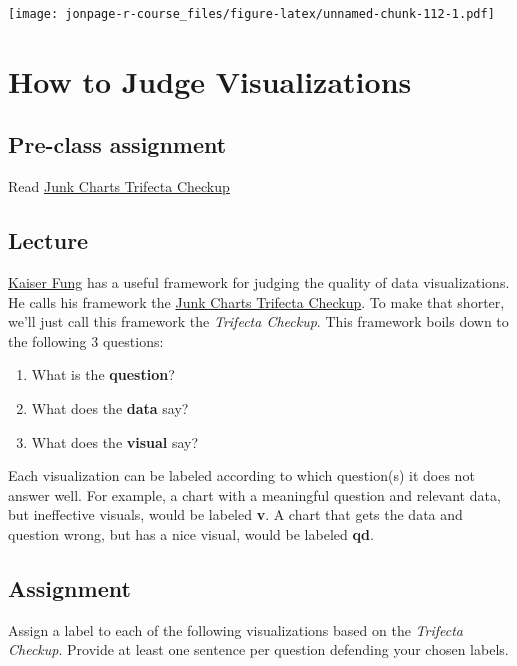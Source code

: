 \documentclass[]{book}
\providecommand{\tightlist}{%
  \setlength{\itemsep}{0pt}\setlength{\parskip}{0pt}}
\theoremstyle{definition}
\theoremstyle{definition}
\theoremstyle{remark}
\begin{document}
\texttt{[image: jonpage-r-course\_files/figure-latex/unnamed-chunk-112-1.pdf]}

\hypertarget{trifecta}{\chapter*{How to Judge
Visualizations}\label{trifecta}}

\section*{Pre-class assignment}\label{pre-class-assignment}

Read
\href{http://junkcharts.typepad.com/junk_charts/junk-charts-trifecta-checkup-the-definitive-guide.html}{Junk
Charts Trifecta Checkup}

\section*{Lecture}\label{lecture}

\href{http://junkcharts.typepad.com/numbersruleyourworld/biography.html}{Kaiser
Fung} has a useful framework for judging the quality of data
visualizations. He calls his framework the
\href{http://junkcharts.typepad.com/junk_charts/junk-charts-trifecta-checkup-the-definitive-guide.html}{Junk
Charts Trifecta Checkup}. To make that shorter, we'll just call this
framework the \emph{Trifecta Checkup}. This framework boils down to the
following 3 questions:

\begin{enumerate}
\def\labelenumi{\arabic{enumi}.}
\tightlist
\item
  What is the \textbf{question}?
\item
  What does the \textbf{data} say?
\item
  What does the \textbf{visual} say?
\end{enumerate}

Each visualization can be labeled according to which question(s) it does
not answer well. For example, a chart with a meaningful question and
relevant data, but ineffective visuals, would be labeled \textbf{v}. A
chart that gets the data and question wrong, but has a nice visual,
would be labeled \textbf{qd}.

\section*{Assignment}\label{assignment-5}

Assign a label to each of the following visualizations based on the
\emph{Trifecta Checkup}. Provide at least one sentence per question
defending your chosen labels.


\end{document}
